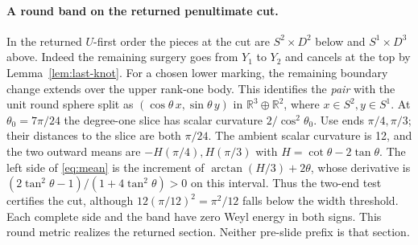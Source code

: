 \documentclass[11pt,letterpaper]{article}
\numberwithin{equation}{section}
\theoremstyle{remark}
\begin{document}
\paragraph{A round band on the returned penultimate cut.}
In the returned \(U\)-first order the pieces at the cut are
\(S^2\times D^2\) below and \(S^1\times D^3\) above. Indeed the
remaining surgery goes from \(Y_1\) to \(Y_2\) and cancels at the top
by Lemma~\ref{lem:last-knot}. For a chosen lower marking, the
remaining boundary change extends over the upper rank-one body.
This identifies the \emph{pair} with the unit round sphere split
as \((\cos\theta\,x,\sin\theta\,y)\) in \(\mathbb R^3\oplus\mathbb R^2\),
where \(x\in S^2,y\in S^1\). At \(\theta_0=7\pi/24\) the degree-one
slice has scalar curvature \(2/\cos^2\theta_0\). Use ends
\(\pi/4,\pi/3\); their distances to the slice are both \(\pi/24\).
The ambient scalar curvature is 12, and the two outward means are
\(-H(\pi/4),H(\pi/3)\) with \(H=\cot\theta-2\tan\theta\).
The left side of \eqref{eq:mean} is the increment of
\(\arctan(H/3)+2\theta\), whose derivative is
\((2\tan^2\theta-1)/(1+4\tan^2\theta)>0\) on this interval.
Thus the two-end test certifies the cut, although
\(12(\pi/12)^2=\pi^2/12\) falls below the width threshold.
Each complete side and the band have zero Weyl energy in both
signs. This round metric realizes the returned section. Neither
pre-slide prefix is that section.
\end{document}
